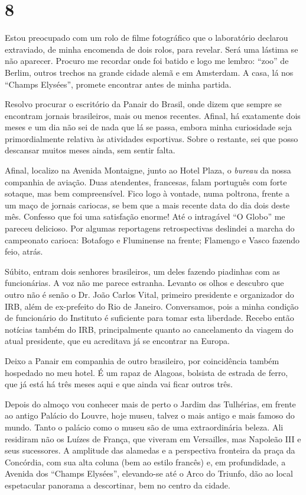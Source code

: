 \section*{8 \adfflatleafright {}}
Estou preocupado com um rolo de filme fotográfico que o laboratório declarou extraviado, de minha encomenda de dois rolos, para revelar. Será uma lástima se não aparecer. Procuro me recordar onde foi batido e logo me lembro: ``zoo'' de Berlim, outros trechos na grande cidade alemã e em Amsterdam. A casa, lá nos ``Champs Elysées'', promete encontrar antes de minha partida.

Resolvo procurar o escritório da Panair do Brasil, onde dizem que sempre se encontram jornais brasileiros, mais ou menos recentes. Afinal, há exatamente dois meses e um dia não sei de nada que lá se passa, embora minha curiosidade seja primordialmente relativa às atividades esportivas. Sobre o restante, sei que posso descansar muitos meses ainda, sem sentir falta.

Afinal, localizo na Avenida Montaigne, junto ao Hotel Plaza, o \textit{bureau} da nossa companhia de aviação. Duas atendentes, francesas, falam português com forte sotaque, mas bem compreensível. Fico logo à vontade, numa poltrona, frente a um maço de jornais cariocas, se bem que a mais recente data do dia dois deste mês. Confesso que foi uma satisfação enorme! Até o intragável ``O Globo'' me pareceu delicioso. Por algumas reportagens retrospectivas deslindei a marcha do campeonato carioca: Botafogo e Fluminense na frente; Flamengo e Vasco fazendo feio, atrás.

Súbito, entram dois senhores brasileiros, um deles fazendo piadinhas com as funcionárias. A voz não me parece estranha. Levanto os olhos e descubro que outro não é senão o Dr. João Carlos Vital, primeiro presidente e organizador do IRB, além de ex-prefeito do Rio de Janeiro. Conversamos, pois a minha condição de funcionário do Instituto é suficiente para tomar esta liberdade. Recebo então notícias também do IRB, principalmente quanto ao cancelamento da viagem do atual presidente, que eu acreditava já se encontrar na Europa.

Deixo a Panair em companhia de outro brasileiro, por coincidência também hospedado no meu hotel. É um rapaz de Alagoas, bolsista de estrada de ferro, que já está há três meses aqui e que ainda vai ficar outros três.

Depois do almoço vou conhecer mais de perto o Jardim das Tulhérias, em frente ao antigo Palácio do Louvre, hoje museu, talvez o mais antigo e mais famoso do mundo. Tanto o palácio como o museu são de uma extraordinária beleza. Ali residiram não os Luízes de França, que viveram em Versailles, mas Napoleão III e seus sucessores. A amplitude das alamedas e a perspectiva fronteira da praça da Concórdia, com sua alta coluna (bem ao estilo francês) e, em profundidade, a Avenida dos ``Champs Elysées'', elevando-se até o Arco do Triunfo, dão ao local espetacular panorama a descortinar, bem no centro da cidade.

